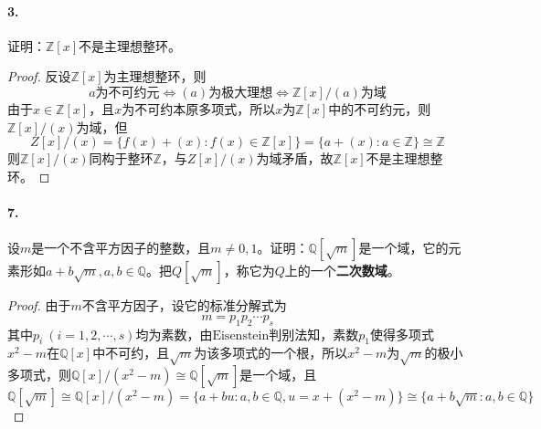 \documentclass[12pt, a4paper, oneside]{ctexart}
\begin{document}
\paragraph{3.}证明：$\mathbb{Z}[x]$不是主理想整环。

\begin{proof}
    反设$\mathbb{Z}[x]$为主理想整环，则
    \begin{equation*}
        a\text{为不可约元}\iff (a)\text{为极大理想}\iff \mathbb{Z}[x]/(a)\text{为域}
    \end{equation*}
    由于$x\in \mathbb{Z}[x]$，且$x$为不可约本原多项式，所以$x$为$\mathbb{Z}[x]$中的不可约元，则$\mathbb{Z}[x]/(x)$为域，但
    \begin{equation*}
        Z[x]/(x)=\{f(x)+(x):f(x)\in\mathbb{Z}[x]\}=\{a+(x):a\in\mathbb{Z}\}\cong \mathbb{Z}
    \end{equation*}
    则$\mathbb{Z}[x]/(x)$同构于整环$\mathbb{Z}$，与$Z[x]/(x)$为域矛盾，故$\mathbb{Z}[x]$不是主理想整环。
\end{proof}

\paragraph{7.}设$m$是一个不含平方因子的整数，且$m\neq 0,1$。证明：$\mathbb{Q}[\sqrt{m}]$是一个域，它的元素形如$a+b\sqrt{m},a,b\in\mathbb{Q}$。把$Q[\sqrt{m}]$，称它为$Q$上的一个\textbf{二次数域}。
\begin{proof}
    由于$m$不含平方因子，设它的标准分解式为
    \begin{equation*}
        m = p_1p_2\cdots p_s
    \end{equation*}
    其中$p_i\ (i=1,2,\cdots,s)$均为素数，由$\text{Eisenstein}$判别法知，素数$p_1$使得多项式$x^2-m$在$\mathbb{Q}[x]$中不可约，且$\sqrt{m}$为该多项式的一个根，所以$x^2-m$为$\sqrt{m}$的极小多项式，则$\mathbb{Q}[x]/(x^2-m)\cong \mathbb{Q}[\sqrt{m}]$是一个域，且
    \begin{equation*}
        \mathbb{Q}[\sqrt{m}] \cong \mathbb{Q}[x]/(x^2-m)=\{a+bu:a,b\in\mathbb{Q},u=x+(x^2-m)\}\cong\{a+b\sqrt{m}:a,b\in\mathbb{Q}\}
    \end{equation*}
\end{proof}
\end{document}
